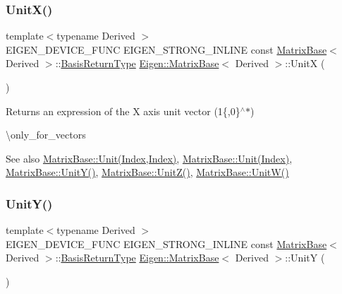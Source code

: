 \subsubsection{\texorpdfstring{UnitX()}{UnitX()}}
{\footnotesize\ttfamily template$<$typename Derived $>$ \\
E\+I\+G\+E\+N\+\_\+\+D\+E\+V\+I\+C\+E\+\_\+\+F\+U\+NC E\+I\+G\+E\+N\+\_\+\+S\+T\+R\+O\+N\+G\+\_\+\+I\+N\+L\+I\+NE const \mbox{\hyperlink{class_eigen_1_1_matrix_base}{Matrix\+Base}}$<$ Derived $>$\+::\mbox{\hyperlink{class_eigen_1_1_block}{Basis\+Return\+Type}} \mbox{\hyperlink{class_eigen_1_1_matrix_base}{Eigen\+::\+Matrix\+Base}}$<$ Derived $>$\+::UnitX (\begin{DoxyParamCaption}{ }\end{DoxyParamCaption})\hspace{0.3cm}{\ttfamily [static]}}

\begin{DoxyReturn}{Returns}
an expression of the X axis unit vector (1\{,0\}$^\wedge$$\ast$)
\end{DoxyReturn}
\textbackslash{}only\+\_\+for\+\_\+vectors

\begin{DoxySeeAlso}{See also}
\mbox{\hyperlink{class_eigen_1_1_matrix_base_a1f39dde25807c1f008aa874e690b3fed}{Matrix\+Base\+::\+Unit(\+Index,\+Index)}}, \mbox{\hyperlink{class_eigen_1_1_matrix_base_a9d7e97faf7755d3e85e831153f02846c}{Matrix\+Base\+::\+Unit(\+Index)}}, \mbox{\hyperlink{class_eigen_1_1_matrix_base_ab8e21066a2e5cf5ca8bb0383e44a6efa}{Matrix\+Base\+::\+Unit\+Y()}}, \mbox{\hyperlink{class_eigen_1_1_matrix_base_a122e525a8f5ef3e4d459055615f662de}{Matrix\+Base\+::\+Unit\+Z()}}, \mbox{\hyperlink{class_eigen_1_1_matrix_base_ac28c3d440440464b1fc8d9f2a6d5624a}{Matrix\+Base\+::\+Unit\+W()}} 
\end{DoxySeeAlso}
\mbox{\label{class_eigen_1_1_matrix_base_ab8e21066a2e5cf5ca8bb0383e44a6efa}} 
\subsubsection{\texorpdfstring{UnitY()}{UnitY()}}
{\footnotesize\ttfamily template$<$typename Derived $>$ \\
E\+I\+G\+E\+N\+\_\+\+D\+E\+V\+I\+C\+E\+\_\+\+F\+U\+NC E\+I\+G\+E\+N\+\_\+\+S\+T\+R\+O\+N\+G\+\_\+\+I\+N\+L\+I\+NE const \mbox{\hyperlink{class_eigen_1_1_matrix_base}{Matrix\+Base}}$<$ Derived $>$\+::\mbox{\hyperlink{class_eigen_1_1_block}{Basis\+Return\+Type}} \mbox{\hyperlink{class_eigen_1_1_matrix_base}{Eigen\+::\+Matrix\+Base}}$<$ Derived $>$\+::UnitY (\begin{DoxyParamCaption}{ }\end{DoxyParamCaption})\hspace{0.3cm}{\ttfamily [static]}}

